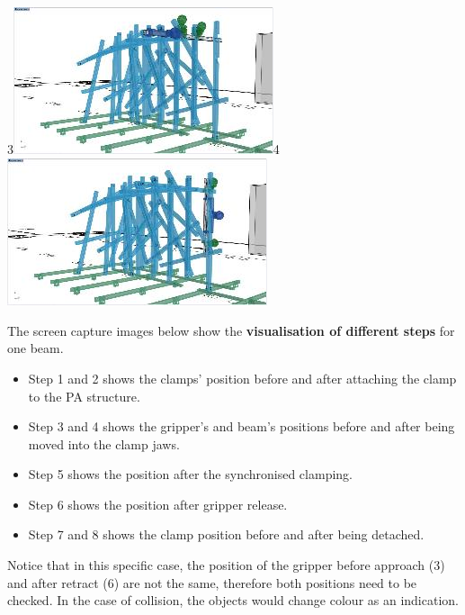 \documentclass[11pt]{book}
\begin{document}
{\small 3\includegraphics[width=7.64cm,height=4.32cm]{./images/image44.jpeg}4\includegraphics[width=7.64cm,height=4.32cm]{./images/image45.jpeg}}

The screen capture images below show the \textbf{visualisation of different steps }for one beam. 

\begin{itemize}
	\item Step 1 and 2 shows the clamps’ position before and after attaching the clamp to the PA structure. 

	\item Step 3 and 4 shows the gripper’s and beam’s positions before and after being moved into the clamp jaws. 

	\item Step 5 shows the position after the synchronised clamping.

	\item Step 6 shows the position after gripper release. 

	\item Step 7 and 8 shows the clamp position before and after being detached.

\end{itemize}
Notice that in this specific case, the position of the gripper before approach (3) and after retract (6) are not the same, therefore both positions need to be checked. In the case of collision, the objects would change colour as an indication.
\end{document}
